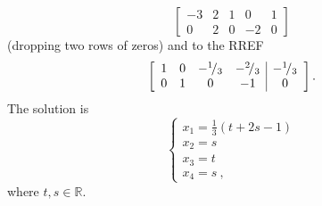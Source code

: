\begin{example}
\begin{enumerate}[(i)]
	\[ \left[ \begin{array}{cccc|c}
		-3 & 2 & 1 &  0 & 1 \\
		 0 & 2 & 0 & -2 & 0 
	\end{array} \right] \]
	(dropping two rows of zeros) and to the RREF
	\[ \left[ \begin{array}{cccc|c}
		1 & 0 & -{}^{1}\!/_{3} & -{}^{2}\!/_{3} & -{}^{1}\!/_{3} \\
		0 & 1 & 0 & -1 & 0 
	\end{array} \right]. \]
	The solution is
	\[ \left\{ \begin{array}{l}
	x_1 = \tfrac13 (t+2s-1) \\
	x_2 = s \\
	x_3 = t \\
	x_4 = s \:,
	\end{array} \right. \]
	where $t,s\in\mathbb{R}.$
\end{enumerate}
\end{example}


